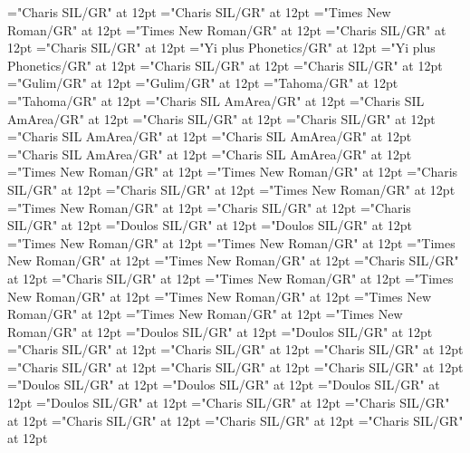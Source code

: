 \documentclass[a4paper,twoside]{article}
\begin{document}
\font\dividZxxxxaudio="Charis SIL/GR" at 12pt
\font\spanidZxxxxaudio="Charis SIL/GR" at 12pt
\font\divid="Times New Roman/GR" at 12pt
\font\spanid="Times New Roman/GR" at 12pt
\font\diviixpin="Charis SIL/GR" at 12pt
\font\spaniixpin="Charis SIL/GR" at 12pt
\font\divii="Yi plus Phonetics/GR" at 12pt
\font\spanii="Yi plus Phonetics/GR" at 12pt
\font\divkm="Charis SIL/GR" at 12pt
\font\spankm="Charis SIL/GR" at 12pt
\font\divko="Gulim/GR" at 12pt
\font\spanko="Gulim/GR" at 12pt
\font\divlv="Tahoma/GR" at 12pt
\font\spanlv="Tahoma/GR" at 12pt
\font\divmiz="Charis SIL AmArea/GR" at 12pt
\font\spanmiz="Charis SIL AmArea/GR" at 12pt
\font\divms="Charis SIL/GR" at 12pt
\font\spanms="Charis SIL/GR" at 12pt
\font\divmxbfonipa="Charis SIL AmArea/GR" at 12pt
\font\spanmxbfonipa="Charis SIL AmArea/GR" at 12pt
\font\divmxb="Charis SIL AmArea/GR" at 12pt
\font\spanmxb="Charis SIL AmArea/GR" at 12pt
\font\divmy="Times New Roman/GR" at 12pt
\font\spanmy="Times New Roman/GR" at 12pt
\font\divne="Charis SIL/GR" at 12pt
\font\spanne="Charis SIL/GR" at 12pt
\font\divpt="Times New Roman/GR" at 12pt
\font\spanpt="Times New Roman/GR" at 12pt
\font\divqaafonipaxkal="Charis SIL/GR" at 12pt
\font\spanqaafonipaxkal="Charis SIL/GR" at 12pt
\font\divqaafonipaxyii="Doulos SIL/GR" at 12pt
\font\spanqaafonipaxyii="Doulos SIL/GR" at 12pt
\font\divqaaxfwt="Times New Roman/GR" at 12pt
\font\spanqaaxfwt="Times New Roman/GR" at 12pt
\font\divqaaxgot="Times New Roman/GR" at 12pt
\font\spanqaaxgot="Times New Roman/GR" at 12pt
\font\divqaaxkal="Charis SIL/GR" at 12pt
\font\spanqaaxkal="Charis SIL/GR" at 12pt
\font\divqaaxlel="Times New Roman/GR" at 12pt
\font\spanqaaxlel="Times New Roman/GR" at 12pt
\font\divqaaxpig="Times New Roman/GR" at 12pt
\font\spanqaaxpig="Times New Roman/GR" at 12pt
\font\divqaaxsim="Times New Roman/GR" at 12pt
\font\spanqaaxsim="Times New Roman/GR" at 12pt
\font\divqaaxsta="Doulos SIL/GR" at 12pt
\font\spanqaaxsta="Doulos SIL/GR" at 12pt
\font\divqaaZxxxxkalAUDIO="Charis SIL/GR" at 12pt
\font\spanqaaZxxxxkalAUDIO="Charis SIL/GR" at 12pt
\font\divro="Charis SIL/GR" at 12pt
\font\spanro="Charis SIL/GR" at 12pt
\font\divru="Charis SIL/GR" at 12pt
\font\spanru="Charis SIL/GR" at 12pt
\font\divsehfonipaxetic="Doulos SIL/GR" at 12pt
\font\spansehfonipaxetic="Doulos SIL/GR" at 12pt
\font\divsehfonipa="Doulos SIL/GR" at 12pt
\font\spansehfonipa="Doulos SIL/GR" at 12pt
\font\divsehZxxxxaudio="Charis SIL/GR" at 12pt
\font\spansehZxxxxaudio="Charis SIL/GR" at 12pt
\font\divseh="Charis SIL/GR" at 12pt
\font\spanseh="Charis SIL/GR" at 12pt
\font\divshhZxxxxaudio="Charis SIL/GR" at 12pt
\end{document}
